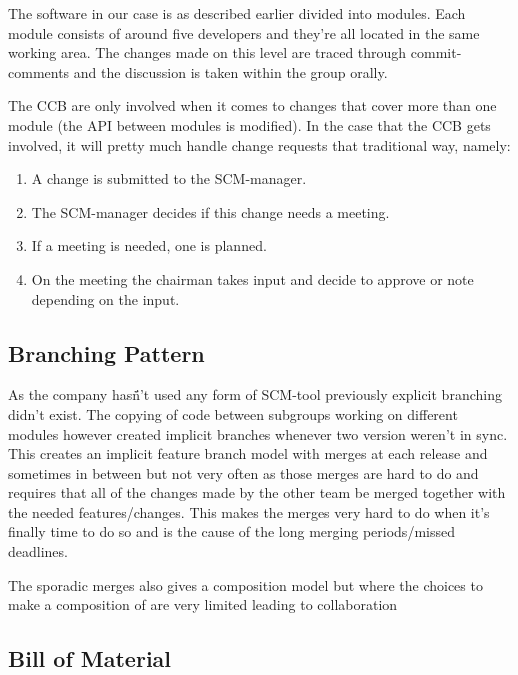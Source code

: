 \documentclass[a4paper,11pt]{article}
\begin{document}
The software in our case is as described earlier divided into modules. Each module consists of around five developers and they're all
located in the same working area. The changes made on this level are traced through commit-comments and the discussion is taken within
the group orally.

The CCB are only involved when it comes to changes that cover more than one module (the API between modules is modified).
In the case that the CCB gets involved, it will pretty much handle change requests that traditional way, namely:

\begin{enumerate}
 \item A change is submitted to the SCM-manager.
 \item The SCM-manager decides if this change needs a meeting.
 \item If a meeting is needed, one is planned.
 \item On the meeting the chairman takes input and decide to approve or note depending on the input.
\end{enumerate}


\subsection{Branching Pattern}\printindex

As the company hasn̈́'t used any form of SCM-tool previously explicit branching didn't exist.
The copying of code between subgroups working on different modules however created implicit branches whenever two version weren't in sync. This creates an implicit feature branch model with merges at each release and sometimes in between but not very often as those merges are hard to do and requires that all of the changes made by the other team be merged together with the needed features/changes. This makes the merges very hard to do when it's finally time to do so and is the cause of the long merging periods/missed deadlines.

The sporadic merges also gives a composition model but where the choices to make a composition of are very limited leading to collaboration

\subsection{Bill of Material}
\end{document}
